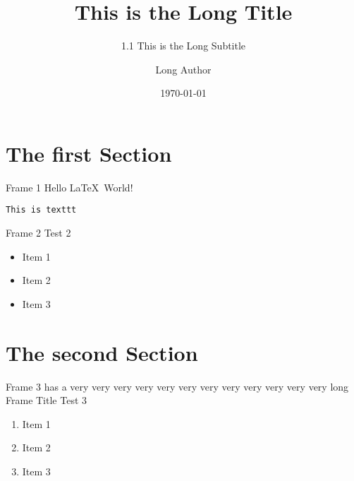\documentclass[aspectratio=169]{beamer}
\title[Short Title]{This is the Long Title}
\subtitle[1.1 Short Subtitle]{1.1 This is the Long Subtitle}
\author[Short Author]{Long Author}
\date{\today}
\begin{document}
    
    \maketitle
    
    \section[First Section]{The first Section}

    \begin{frame}{Frame 1}
        Hello \LaTeX\ World! 
        
        \texttt{This is texttt}
    \end{frame}

    \begin{frame}{Frame 2}
        Test 2
        \begin{itemize}
            \item Item 1
            \item Item 2
            \item Item 3
        \end{itemize}
    \end{frame}

    \section[Second Section]{The second Section}

    \begin{frame}{Frame 3 has a very very very very very very very very very very very very long Frame Title}
        Test 3
        \begin{enumerate}
            \item Item 1
            \item Item 2
            \item Item 3
        \end{enumerate}
    \end{frame}
\end{document}
